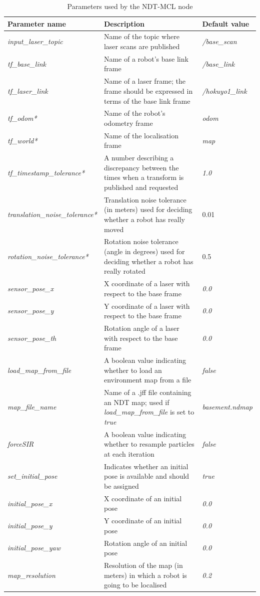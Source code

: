\documentclass[12pt]{article}
\begin{document}
		\begin{longtable}{| p{4.7cm} | p{7.2cm} | p{3.3cm} |}
			\caption{Parameters used by the NDT-MCL node} \\\hline
			{\bf Parameter name} & {\bf Description} & {\bf Default value} \\\hline
			{\it input\_laser\_topic} & Name of the topic where laser scans are published & {\it /base\_scan} \\\hline
			{\it tf\_base\_link} & Name of a robot's base link frame & {\it /base\_link} \\\hline
			{\it tf\_laser\_link} & Name of a laser frame; the frame should be expressed in terms of the base link frame & {\it /hokuyo1\_link} \\\hline
			{\it tf\_odom*} & Name of the robot's odometry frame & {\it odom} \\\hline
			{\it tf\_world*} & Name of the localisation frame & {\it map} \\\hline
			{\it tf\_timestamp\_tolerance*} & A number describing a discrepancy between the times when a transform is published and requested & {\it 1.0} \\\hline
			{\it translation\_noise\_tolerance*} & Translation noise tolerance (in meters) used for deciding whether a robot has really moved & 0.01 \\\hline
			{\it rotation\_noise\_tolerance*} & Rotation noise tolerance (angle in degrees) used for deciding whether a robot has really rotated & 0.5 \\\hline
			{\it sensor\_pose\_x} & X coordinate of a laser with respect to the base frame & {\it 0.0} \\\hline
			{\it sensor\_pose\_y} & Y coordinate of a laser with respect to the base frame & {\it 0.0} \\\hline
			{\it sensor\_pose\_th} & Rotation angle of a laser with respect to the base frame & {\it 0.0} \\\hline
			{\it load\_map\_from\_file} & A boolean value indicating whether to load an environment map from a file & {\it false} \\\hline
			{\it map\_file\_name} & Name of a .jff file containing an NDT map; used if {\it load\_map\_from\_file} is set to {\it true} & {\it basement.ndmap} \\\hline
			{\it forceSIR} & A boolean value indicating whether to resample particles at each iteration & {\it false} \\\hline
			{\it set\_initial\_pose} & Indicates whether an initial pose is available and should be assigned & {\it true} \\\hline
			{\it initial\_pose\_x} & X coordinate of an initial pose & {\it 0.0} \\\hline
			{\it initial\_pose\_y} & Y coordinate of an initial pose & {\it 0.0} \\\hline
			{\it initial\_pose\_yaw} & Rotation angle of an initial pose & {\it 0.0} \\\hline
			{\it map\_resolution} & Resolution of the map (in meters) in which a robot is going to be localised & {\it 0.2} \\\hline
		\end{longtable}
\end{document}
